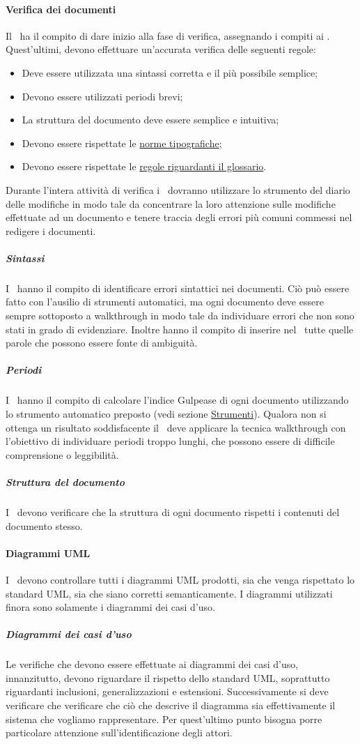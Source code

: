 \documentclass[../NormeProgetto.tex]{subfiles}
\begin{document}
	\paragraph{Verifica dei documenti}
	Il \responsabilediprogetto\ ha il compito di dare inizio alla fase di verifica, assegnando i compiti ai \verificatori. Quest'ultimi, devono effettuare un'accurata verifica delle seguenti regole:
	\begin{itemize}
		\item Deve essere utilizzata una sintassi corretta e il più possibile semplice;
		\item Devono essere utilizzati periodi brevi;
		\item La struttura del documento deve essere semplice e intuitiva;
		\item Devono essere rispettate le  \hyperref[sec:Norme tipografiche]{norme tipografiche};
		\item Devono essere rispettate le \hyperref[sec:Glossario]{regole riguardanti il glossario}.
	\end{itemize}
	Durante l'intera attività di verifica i \verificatori\ dovranno utilizzare lo strumento del diario delle modifiche in modo tale da concentrare la loro attenzione sulle modifiche effettuate ad un documento e tenere traccia degli errori più comuni commessi nel redigere i documenti.
		\subparagraph{Sintassi}
		I \verificatori\ hanno il compito di identificare errori sintattici nei documenti. Ciò può essere fatto con l'ausilio di strumenti automatici, ma ogni documento deve essere sempre sottoposto a walkthrough in modo tale da individuare errori che non sono stati in grado di evidenziare. Inoltre hanno il compito di inserire nel \glossario\ tutte quelle parole che possono essere fonte di ambiguità.
		\subparagraph{Periodi}
		I \verificatori\ hanno il compito di calcolare l’indice Gulpease di ogni documento utilizzando lo strumento automatico preposto (vedi sezione \hyperref[sec:Strumenti]{Strumenti}). Qualora non si ottenga un risultato soddisfacente il \verificatore\ deve applicare la tecnica walkthrough con l'obiettivo di individuare periodi troppo lunghi, che possono essere di difficile comprensione o leggibilità.
		\subparagraph{Struttura del documento}
		I \verificatori\ devono verificare che la struttura di ogni documento rispetti i contenuti del documento stesso.
	\paragraph{Diagrammi UML}
		I \verificatori\ devono controllare tutti i diagrammi UML prodotti, sia che venga rispettato lo standard UML, sia che siano corretti semanticamente. I diagrammi utilizzati finora sono solamente i diagrammi dei casi d'uso.
			\subparagraph{Diagrammi dei casi d'uso}
			Le verifiche che devono essere effettuate ai diagrammi dei casi d'uso, innanzitutto, devono riguardare il rispetto dello standard UML, soprattutto riguardanti inclusioni, generalizzazioni e estensioni. Successivamente si deve verificare che verificare che ciò che descrive il diagramma sia effettivamente il sistema che vogliamo rappresentare. Per quest'ultimo punto bisogna porre particolare attenzione sull'identificazione degli attori. \\ 
\end{document}
